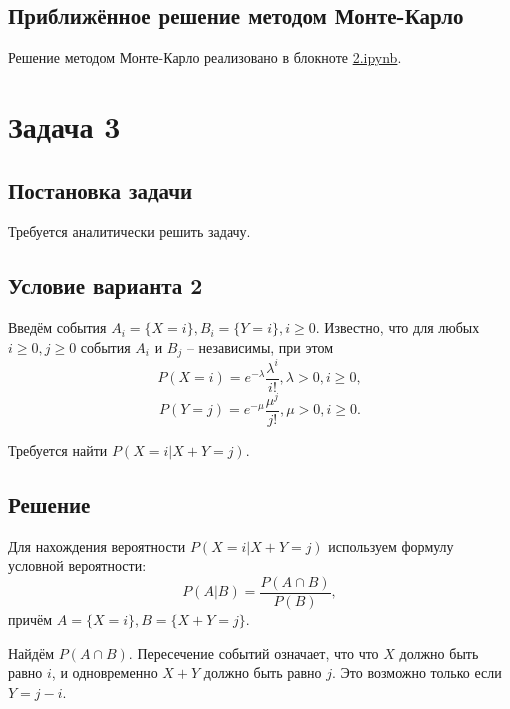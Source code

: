 \documentclass[a4paper,14pt]{extarticle}
\begin{document}
        \subsection*{Приближённое решение методом Монте-Карло}
            Решение методом Монте-Карло реализовано в блокноте \href{https://github.com/vorandpav/TVIPS}{2.ipynb}.


            
    
    
    \section*{Задача 3}
        
        \subsection*{Постановка задачи}
            
            Требуется аналитически решить задачу.
        
        \subsection*{Условие варианта 2}
            
            Введём события \( A_i = \{X = i\}, B_i = \{Y = i\}, i \geq 0 \). Известно, что для любых \( i \geq 0, j \geq 0 \) события \( A_i \) и \( B_j \) -- независимы, при этом
            \[ P(X = i) = e^{-\lambda} \frac{\lambda^i}{i!}, \lambda > 0, i \geq 0, \]
            \[ P(Y = j) = e^{-\mu} \frac{\mu^j}{j!}, \mu > 0, i \geq 0. \]
            
            Требуется найти \( P(X = i | X + Y = j) \).
        
        \subsection*{Решение}
            
            Для нахождения вероятности \( P(X = i | X + Y = j) \) используем формулу условной вероятности:
            \[ P(A|B) = \frac{P( A \cap B)}{P(B)}, \]
            причём \(A = \{X = i\}, B = \{X + Y = j\}\).
            
            Найдём \(P( A \cap B)\). Пересечение событий означает, что что \(X\) должно быть равно \(i\), и одновременно \(X+Y\) должно быть равно \(j\). Это возможно только если \(Y=j-i\).
            
\end{document}
